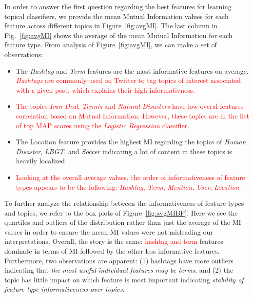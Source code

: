 
In order to answer the first question regarding the best features
for learning topical classifiers, we provide the mean Mutual Information
values for each feature across different topics in Figure~\ref{fig:avgMI}.
The last column in Fig.~\ref{fig:avgMI} shows the
average of the mean Mutual Information for each feature type. From analysis of
Figure~\ref{fig:avgMI}, we can make a set of observations:
\begin{itemize}
\item The \textit{Hashtag} and \textit{Term} features are the most informative features on average. \textcolor{red}{ \textit{Hashtags} are commonly used on Twitter to tag topics of interest associated with a given post, which explains their high informativness.}

\item \textcolor{red}{The topics \textit{Iran Deal}, \textit{Tennis} and \textit{Natural Disasters} have low overal features correlation based on Mutual Information. However, these topics  are in the list of top MAP scores using the \textit{Logistic Regression} classifier.}

\item The Location feature provides the highest MI regarding the topics of \textit{Human Disaster}, \textit{LBGT}, and \textit{Soccer} indicating a lot of content in these topics is heavily localized.
\item \textcolor{red}{ Looking at the overall average values, the order of informativeness of feature types appears to be the following: \textit{Hashtag}, \textit{Term}, \textit{Mention}, \textit{User}, \textit{Location}.}
\end{itemize}
To further analyze the relationship between the informativeness of feature types and topics,
we refer to the box plots of Figure~\ref{fig:avgMIBP}.  Here we see the quartiles and outliers of
the distribution rather than just the average of the MI values in order to ensure the mean MI
values were not misleading our interpretations.  Overall, the story is the same: \textcolor{red}{ hashtag
and term} features dominate in terms of MI followed by the other less informative
features.  Furthermore, two observations are apparent: (1) hashtags have more outliers indicating that
\emph{the most useful individual features may be terms}, and (2) the topic has little impact on which feature
is most important indicating \emph{stability of feature type informativeness over topics}.

